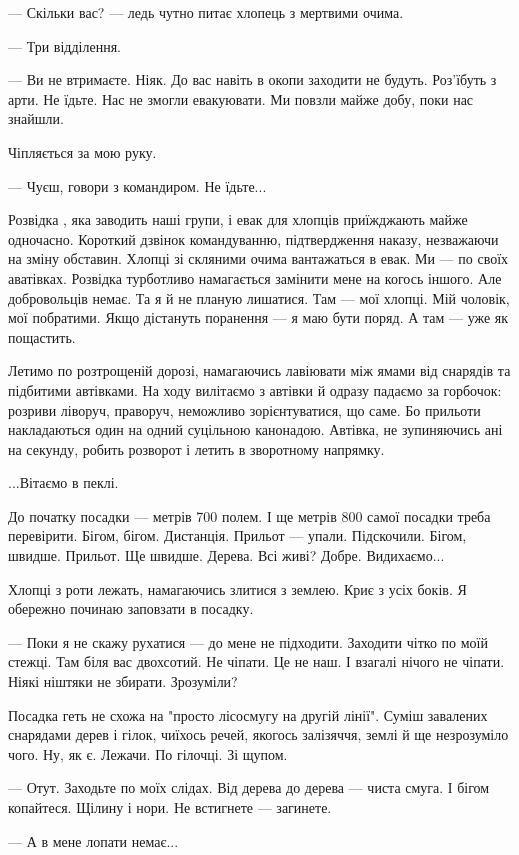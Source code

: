 — Скільки вас? — ледь чутно питає  хлопець  з мертвими очима.

— Три відділення.

— Ви не втримаєте. Ніяк. До вас навіть в окопи заходити  не будуть. Роз'їбуть з
арти. Не їдьте. Нас не змогли евакуювати. Ми повзли майже добу, поки нас
знайшли. 

Чіпляється за мою руку. 

— Чуєш,  говори з командиром. Не їдьте...

Розвідка , яка заводить наші групи, і евак для хлопців приїжджають майже
одночасно. Короткий дзвінок командуванню, підтвердження наказу, незважаючи на
зміну обставин.  Хлопці зі скляними  очима вантажаться в евак. Ми — по своїх
аватівках. Розвідка  турботливо  намагається замінити мене на когось іншого.
Але добровольців  немає. Та я й не планую лишатися. Там — мої хлопці.  Мій
чоловік, мої побратими. Якщо дістануть поранення — я маю бути поряд. А там —
уже  як пощастить. 

Летимо  по розтрощеній  дорозі, намагаючись  лавіювати між ямами від снарядів
та підбитими  автівками. На ходу вилітаємо з автівки й одразу падаємо за
горбочок: розриви ліворуч, праворуч, неможливо зорієнтуватися, що саме. Бо
прильоти накладаються один на одний суцільною канонадою. Автівка, не
зупиняючись ані на секунду, робить розворот і  летить в зворотному напрямку.  

...Вітаємо в пеклі. 

До початку посадки — метрів 700 полем. І ще метрів 800 самої посадки треба
перевірити. Бігом, бігом. Дистанція.  Прильот — упали. Підскочили. Бігом,
швидше. Прильот. Ще швидше. Дерева. Всі  живі? Добре. Видихаємо...

Хлопці з роти лежать, намагаючись злитися з землею.  Криє з усіх боків.  Я
обережно починаю заповзати в посадку. 

— Поки  я не скажу рухатися — до мене не підходити. Заходити чітко по моїй
стежці. Там біля вас двохсотий. Не чіпати. Це не наш. І взагалі нічого не
чіпати. Ніякі ніштяки не збирати. Зрозуміли? 

Посадка геть не схожа на "просто лісосмугу на другій лінії". Суміш завалених
снарядами дерев і гілок, чиїхось речей, якогось залізяччя, землі й ще
незрозуміло чого. Ну, як є.  Лежачи. По гілочці. Зі щупом. 

— Отут. Заходьте по моїх слідах. Від дерева до дерева — чиста смуга. І бігом
копайтеся. Щілину і нори. Не встигнете  — загинете. 

— А в мене лопати немає...

